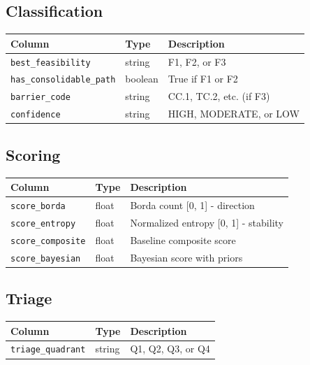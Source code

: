 \documentclass[
  letterpaper,
]{report}
\begin{document}
\subsection{Classification}\label{classification}

\begin{longtable}[]{@{}lll@{}}
\toprule\noalign{}
Column & Type & Description \\
\midrule\noalign{}
\endhead
\bottomrule\noalign{}
\endlastfoot
\texttt{best\_feasibility} & string & F1, F2, or F3 \\
\texttt{has\_consolidable\_path} & boolean & True if F1 or F2 \\
\texttt{barrier\_code} & string & CC.1, TC.2, etc. (if F3) \\
\texttt{confidence} & string & HIGH, MODERATE, or LOW \\
\end{longtable}

\subsection{Scoring}\label{scoring}

\begin{longtable}[]{@{}lll@{}}
\toprule\noalign{}
Column & Type & Description \\
\midrule\noalign{}
\endhead
\bottomrule\noalign{}
\endlastfoot
\texttt{score\_borda} & float & Borda count {[}0, 1{]} - direction \\
\texttt{score\_entropy} & float & Normalized entropy {[}0, 1{]} -
stability \\
\texttt{score\_composite} & float & Baseline composite score \\
\texttt{score\_bayesian} & float & Bayesian score with priors \\
\end{longtable}

\subsection{Triage}\label{triage}

\begin{longtable}[]{@{}lll@{}}
\toprule\noalign{}
Column & Type & Description \\
\midrule\noalign{}
\endhead
\bottomrule\noalign{}
\endlastfoot
\texttt{triage\_quadrant} & string & Q1, Q2, Q3, or Q4 \\
\end{longtable}
\end{document}
